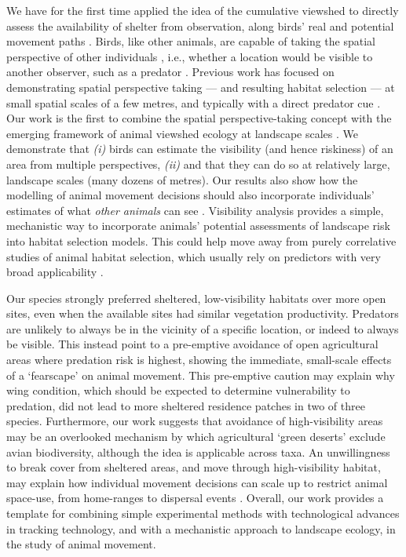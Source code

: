 \begin{refsection}
We have for the first time applied the idea of the cumulative viewshed to directly assess the availability of shelter from observation, along birds' real and potential movement paths \cite{olsoy2015}.
Birds, like other animals, are capable of taking the spatial perspective of other individuals \cite{emery2000,krams2001,watve2002,davidson2016}, i.e., whether a location would be visible to another observer, such as a predator \citep{watve2002,olsoy2015}.
Previous work has focused on demonstrating spatial perspective taking --- and resulting habitat selection --- at small spatial scales of a few metres, and typically with a direct predator cue \cite{krams2001,watve2002}.
Our work is the first to combine the spatial perspective-taking concept with the emerging framework of animal viewshed ecology at landscape scales \cite{aben2018,aben2021}.
We demonstrate that \textit{(i)} birds can estimate the visibility (and hence riskiness) of an area from multiple perspectives, \textit{(ii)} and that they can do so at relatively large, landscape scales (many dozens of metres).
Our results also show how the modelling of animal movement decisions should also incorporate individuals' estimates of what \textit{other animals} can see \cite{emery2000}.
Visibility analysis provides a simple, mechanistic way to incorporate animals' potential assessments of landscape risk into habitat selection models.
This could help move away from purely correlative studies of animal habitat selection, which usually rely on predictors with very broad applicability \cite{pettorelli2011}.

Our species strongly preferred sheltered, low-visibility habitats over more open sites, even when the available sites had similar vegetation productivity.
Predators are unlikely to always be in the vicinity of a specific location, or indeed to always be visible.
This instead point to a pre-emptive avoidance of open agricultural areas where predation risk is highest, showing the immediate, small-scale effects of a `fearscape' \cite{olsoy2015} on animal movement.
This pre-emptive caution may explain why wing condition, which should be expected to determine vulnerability to predation, did not lead to more sheltered residence patches in two of three species.
Furthermore, our work suggests that avoidance of high-visibility areas may be an overlooked mechanism by which agricultural `green deserts' exclude avian biodiversity, although the idea is applicable across taxa.
An unwillingness to break cover from sheltered areas, and move through high-visibility habitat, may explain how individual movement decisions can scale up to restrict animal space-use, from home-ranges to dispersal events \cite{schlagel2020}.
Overall, our work provides a template for combining simple experimental methods with technological advances in tracking technology, and with a mechanistic approach to landscape ecology, in the study of animal movement.


\end{refsection}
